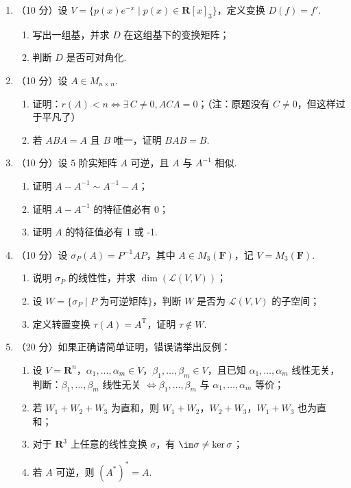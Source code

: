 \begin{enumerate}
    \item （10 分）设 $V = \{ p(x)e^{-x} \mid p(x) \in \mathbf{R}[x]_3 \}$，定义变换 $D(f) = f'$.
    \begin{enumerate}
        \item 写出一组基，并求 $D$ 在这组基下的变换矩阵；
        \item 判断 $D$ 是否可对角化.
    \end{enumerate}

    \item （10 分）设 $A \in M_{n \times n}$.
    \begin{enumerate}
        \item 证明：$r(A) < n \iff \exists\, C \neq 0, ACA=0$；（注：原题没有 $C \neq 0$，但这样过于平凡了）
        \item 若 $ABA=A$ 且 $B$ 唯一，证明 $BAB=B$.
    \end{enumerate}

    \item （10 分）设 $5$ 阶实矩阵 $A$ 可逆，且 $A$ 与 $A^{-1}$ 相似.
    \begin{enumerate}
        \item 证明 $A - A^{-1} \sim A^{-1} - A$；
        \item 证明 $A - A^{-1}$ 的特征值必有 0；
        \item 证明 $A$ 的特征值必有 1 或 -1.
    \end{enumerate}

    \item （10 分）设 $\sigma_P(A) = P^{-1}AP$，其中 $A \in M_3(\mathbf{F})$，记 $V = M_3(\mathbf{F})$.
    \begin{enumerate}
        \item 说明 $\sigma_P$ 的线性性，并求 $\dim(\mathcal{L}(V, V))$；
        \item 设 $W = \{ \sigma_P \mid P \text{ 为可逆矩阵} \}$，判断 $W$ 是否为 $\mathcal{L}(V, V)$ 的子空间；
        \item 定义转置变换 $\tau(A) = A^\mathrm{T}$，证明 $\tau \notin W$.
    \end{enumerate}

    \item （20 分）如果正确请简单证明，错误请举出反例：
    \begin{enumerate}
        \item 设 $V=\mathbf{R}^n$，$\alpha_1, \dots, \alpha_m \in V$，$\beta_1, \dots, \beta_m \in V$，且已知 $\alpha_1, \dots, \alpha_m$ 线性无关，判断：$\beta_1, \dots, \beta_m$ 线性无关 $\iff \beta_1, \dots, \beta_m$ 与 $\alpha_1, \dots, \alpha_m$ 等价；

        \item 若 $W_1+W_2+W_3$ 为直和，则 $W_1+W_2$，$W_2+W_3$，$W_1+W_3$ 也为直和；

        \item 对于 $\mathbf{R}^3$ 上任意的线性变换 $\sigma$，有 $\im\sigma \neq \ker\sigma$；

        \item 若 $A$ 可逆，则 $(A^*)^* = A$.
    \end{enumerate}

\end{enumerate}

\clearpage
